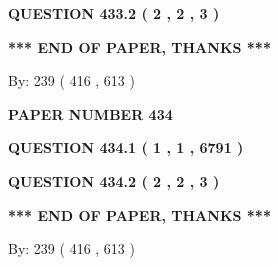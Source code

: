 \documentclass[12pt]{article}
\begin{document}
  
  
\vspace{0.2in}
  
{\textbf{\Large{QUESTION
433.2 
 ( 2 , 2 , 3 )
}}}
  
  
   
   
 \vspace{0.2in}
 
   
   
   
   
\vspace{1.0in} 
{\textbf{\large{ *** END OF PAPER, THANKS *** }}} 
   
   
\hspace{1.0in} By: 
 239 ( 416 ,  613 )
   
   
   
   
\newpage 
\setcounter{page}{ 
   434001 } 
   
   
   
   
 {\textbf{ \Large{ PAPER NUMBER  434  }}}
   
   
\vspace{0.2in}
   
   
   
   
   
   
 \vspace{0.2in}
 
 
 
 
   
   
  
\vspace{0.2in}
  
{\textbf{\Large{QUESTION
434.1 
 ( 1 , 1 , 6791 )
}}}
  
  
  
\vspace{0.2in}
  
{\textbf{\Large{QUESTION
434.2 
 ( 2 , 2 , 3 )
}}}
  
  
   
   
 \vspace{0.2in}
 
   
   
   
   
\vspace{1.0in} 
{\textbf{\large{ *** END OF PAPER, THANKS *** }}} 
   
   
\hspace{1.0in} By: 
 239 ( 416 ,  613 )
   
   
   
\end{document}
